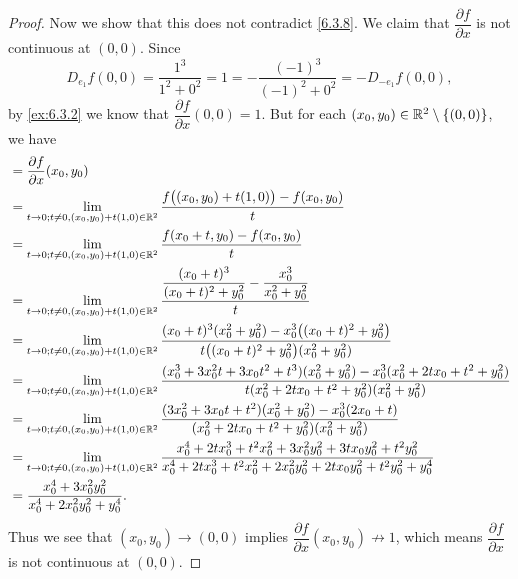 \begin{proof}
  Now we show that this does not contradict \cref{6.3.8}.
  We claim that \(\dfrac{\partial f}{\partial x}\) is not continuous at \((0, 0)\).
  Since
  \[
    D_{e_1} f(0, 0) = \dfrac{1^3}{1^2 + 0^2} = 1 = -\dfrac{(-1)^3}{(-1)^2 + 0^2} = -D_{-e_1} f(0, 0),
  \]
  by \cref{ex:6.3.2} we know that \(\dfrac{\partial f}{\partial x}(0, 0) = 1\).
  But for each \((x_0, y_0) \in \mathbb{R}^2 \setminus \left\lbrace(0, 0)\right\rbrace\), we have
  \begin{align*}
     & = \dfrac{\partial f}{\partial x}(x_0, y_0)                                                                                                                                                                                      \\
     & = \lim_{t \to 0 ; t \neq 0, (x_0, y_0) + t(1, 0) \in \mathbb{R}^2} \dfrac{f\big((x_0, y_0) + t(1, 0)\big) - f(x_0, y_0)}{t}                                                                                                             \\
     & = \lim_{t \to 0 ; t \neq 0, (x_0, y_0) + t(1, 0) \in \mathbb{R}^2} \dfrac{f(x_0 + t, y_0) - f(x_0, y_0)}{t}                                                                                                                             \\
     & = \lim_{t \to 0 ; t \neq 0, (x_0, y_0) + t(1, 0) \in \mathbb{R}^2} \dfrac{\dfrac{(x_0 + t)^3}{(x_0 + t)^2 + y_0^2} - \dfrac{x_0^3}{x_0^2 + y_0^2}}{t}                                                                                   \\
     & = \lim_{t \to 0 ; t \neq 0, (x_0, y_0) + t(1, 0) \in \mathbb{R}^2} \dfrac{(x_0 + t)^3 (x_0^2 + y_0^2) - x_0^3 \big((x_0 + t)^2 + y_0^2\big)}{t \big((x_0 + t)^2 + y_0^2\big) (x_0^2 + y_0^2)}                                           \\
     & = \lim_{t \to 0 ; t \neq 0, (x_0, y_0) + t(1, 0) \in \mathbb{R}^2} \dfrac{(x_0^3 + 3 x_0^2 t + 3 x_0 t^2 + t^3) (x_0^2 + y_0^2) - x_0^3 (x_0^2 + 2 t x_0 + t^2 + y_0^2)}{t (x_0^2 + 2 t x_0 + t^2 + y_0^2) (x_0^2 + y_0^2)}             \\
     & = \lim_{t \to 0 ; t \neq 0, (x_0, y_0) + t(1, 0) \in \mathbb{R}^2} \dfrac{(3 x_0^2 + 3 x_0 t + t^2) (x_0^2 + y_0^2) - x_0^3 (2 x_0 + t)}{(x_0^2 + 2 t x_0 + t^2 + y_0^2) (x_0^2 + y_0^2)}                                               \\
     & = \lim_{t \to 0 ; t \neq 0, (x_0, y_0) + t(1, 0) \in \mathbb{R}^2} \dfrac{x_0^4 + 2 t x_0^3 + t^2 x_0^2 + 3 x_0^2 y_0^2 + 3 t x_0 y_0^2 + t^2 y_0^2}{x_0^4 + 2 t x_0^3 + t^2 x_0^2 + 2 x_0^2 y_0^2 + 2 t x_0 y_0^2 + t^2 y_0^2 + y_0^4} \\
     & = \dfrac{x_0^4 + 3 x_0^2 y_0^2}{x_0^4 + 2 x_0^2 y_0^2 + y_0^4}.
  \end{align*}
  Thus we see that \((x_0, y_0) \to (0, 0)\) implies \(\dfrac{\partial f}{\partial x}(x_0, y_0) \not\to 1\), which means \(\dfrac{\partial f}{\partial x}\) is not continuous at \((0, 0)\).
\end{proof}

